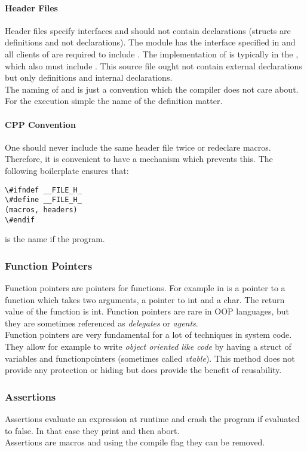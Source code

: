 \paragraph{Header Files}
Header files specify interfaces and should not contain declarations (structs are definitions and not declarations). The module  has the interface specified in  and all clients of  are required to include . The implementation of  is typically in the , which also must include . This source file ought not contain external declarations but only definitions and internal declarations.\\
The naming of  and  is just a convention which the compiler does not care about. For the execution simple the name of the definition matter.

\paragraph{CPP Convention}
One should never include the same header file twice or redeclare macros. Therefore, it is convenient to have a mechanism which prevents this. The following boilerplate ensures that:

\begin{lstlisting}
\#ifndef __FILE_H_
\#define __FILE_H_
(macros, headers)
\#endif
\end{lstlisting}

 is the name if the program.

\subsubsection{Function Pointers}
Function pointers are pointers for functions. For example in   is a pointer to a function which takes two arguments, a pointer to int and a char. The return value of the function is int. Function pointers are rare in OOP languages, but they are sometimes referenced as \textit{delegates} or \textit{agents}.\\
Function pointers are very fundamental for a lot of techniques in system code. They allow for example to write \textit{object oriented like code} by having a struct of variables and functionpointers (sometimes called \textit{vtable}). This method does not provide any protection or hiding but does provide the benefit of reusability.

\subsubsection{Assertions}
Assertions evaluate an expression at runtime and crash the program if evaluated to false. In that case they print  and then abort.\\
Assertions are macros and using the compile flag  they can be removed.

